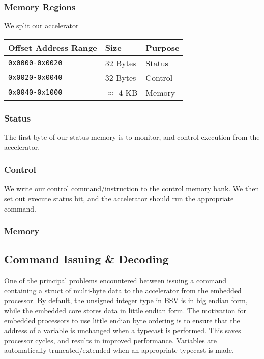 \documentclass[a4paper,9pt]{report}
\begin{document}
\subsubsection{Memory Regions}
We split our accelerator 
\begin{table}
  \centering
\begin{tabular}{lll}
  \toprule
  Offset Address Range & Size & Purpose \\
  \midrule
  \texttt{0x0000-0x0020} & 32 Bytes & Status \\
  \texttt{0x0020-0x0040} & 32 Bytes & Control \\
  \texttt{0x0040-0x1000} & $\approx$ 4 KB & Memory \\
  \bottomrule
\end{tabular}
\end{table}

\subsubsection{Status}
The first byte of our status memory is to monitor, and control execution from
the accelerator.

\subsubsection{Control}
We write our control command/instruction to the control memory bank. We then set out
execute status bit, and the accelerator should run the appropriate command.

\subsubsection{Memory}


\subsection{Command Issuing \& Decoding}
One of the principal problems encountered between issuing a command containing
a struct of multi-byte data to the accelerator from the embedded processor. By
default, the unsigned integer type in BSV is in big endian form, while the
embedded core stores data in little endian form. The motivation for embedded
processors to use little endian byte ordering is to ensure that the address of a
variable is unchanged when a typecast is performed. This saves processor cycles,
and results in improved performance. Variables are automatically
truncated/extended when an appropriate typecast is made. \\
\end{document}
